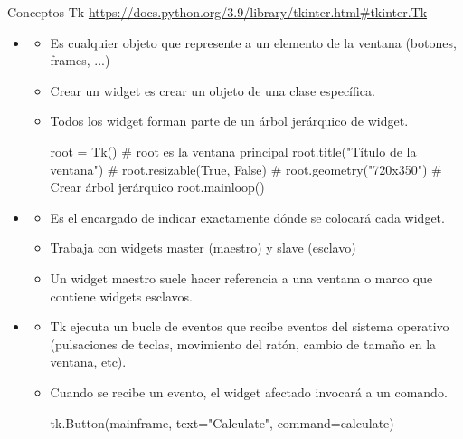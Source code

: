 \documentclass[10pt, envcountsect , spanish]{beamer}
\begin{document}
\begin{frame}[fragile]{Conceptos Tk} {\url{https://docs.python.org/3.9/library/tkinter.html\#tkinter.Tk}}
\begin{itemize}
\item{}
\begin{itemize}
\item Es cualquier objeto que represente a un elemento de la ventana (botones, frames, ...)
\item Crear un widget es crear un objeto de una clase específica.
\item Todos los widget forman parte de un árbol jerárquico de widget.
\footnotesize
\begin{pyverbatim}[][frame=single]
root = Tk()  #  root es la ventana principal
root.title("Título de la ventana")
# root.resizable(True, False)
# root.geometry("720x350")
# Crear árbol jerárquico
root.mainloop()
\end{pyverbatim}
\end{itemize}

\item {}
\begin{itemize}
\item Es el encargado de indicar exactamente dónde se colocará cada widget.
\item Trabaja con widgets  master (maestro) y slave (esclavo)
\item Un widget maestro suele hacer referencia a una ventana o marco que contiene widgets esclavos.
\end{itemize}

\item {}  
\begin{itemize}
\item Tk ejecuta un bucle de eventos que recibe eventos del sistema operativo (pulsaciones de teclas, movimiento del ratón, cambio de tamaño en la ventana, etc).
\item Cuando se recibe un evento, el widget afectado invocará a un comando.

\footnotesize
\begin{pyverbatim}[][frame=single]
tk.Button(mainframe, text="Calculate", command=calculate)
\end{pyverbatim}
\end{itemize}

\end{itemize}
\end{frame}
\end{document}
